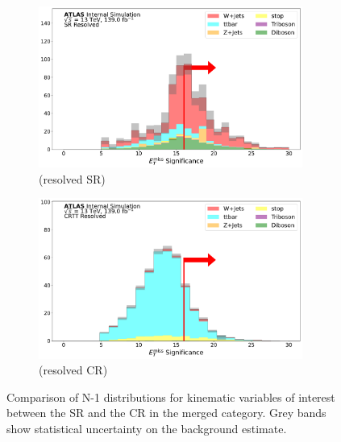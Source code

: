 \begin{figure}[htbp]
  \begin{subfigure}{0.45\textwidth}
     \includegraphics[width = 0.95\textwidth]{Figures/App_SR_CR_distributions/SR1L_Resolved/MetTST_Significance_N_1.pdf}
    \caption{\metsig (resolved SR)}
     \end{subfigure}
    \begin{subfigure}{0.45\textwidth}
     \includegraphics[width = 0.95\textwidth]{Figures/App_SR_CR_distributions/CRTT_Resolved/MetTST_Significance_N_1.pdf}
     \caption{\metsig (resolved \ttbar CR)}
     \end{subfigure}
     \caption[Comparison of N-1 distributions for kinematic variables of interest between the signal region and the \ttbar control region in the resolved category.]{Comparison of N-1 distributions for kinematic variables of interest between the SR and the \ttbar CR in the merged category. Grey bands show statistical uncertainty on the background estimate.}
     \label{fig:N_1_CRTT_resolved}
     \end{figure}
     
     \captionsetup[figure]{list=no}

